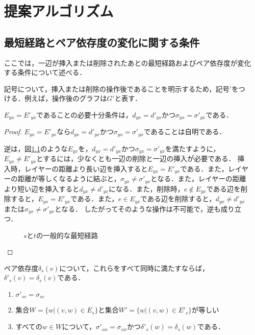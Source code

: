 \chapter{提案アルゴリズム}
\label{chap:algorithm}

\section{最短経路とペア依存度の変化に関する条件}
\label{sect:condition-of-variability}

ここでは，一辺が挿入または削除されたあとの最短経路およびペア依存度が変化する条件について述べる．

記号について，挿入または削除の操作後であることを明示するため，記号$'$をつける．例えば，操作後のグラフは$G'$と表す．

\begin{lemma}
  \label{lemma:condition-of-invariability-of-shortest-path}
  $E_{yx}=E'_{yx}$であることの必要十分条件は，$d_{yx}=d'_{yx}$かつ$\sigma_{yx}=\sigma'_{yx}$である．
\end{lemma}
\begin{proof}
  $E_{yx}=E'_{yx}$なら$d_{yx}=d'_{yx}$かつ$\sigma_{yx}=\sigma'_{yx}$であることは自明である．

  逆は，図\ref{fig:proof-invariability-of-paths}のような$E_{yx}$を，$d_{yx}=d'_{yx}$かつ$\sigma_{yx}=\sigma'_{yx}$を満たすように，$E_{yx}\neq E'_{yx}$とするには，少なくとも一辺の削除と一辺の挿入が必要である．
  挿入時，レイヤーの距離より長い辺を挿入すると$E_{yx}=E'_{yx}$である．また，レイヤーの距離が等しくなるように結ぶと，$\sigma_{yx}\neq\sigma'_{yx}$となる．また，レイヤーの距離より短い辺を挿入すると$d_{yx}\neq d'_{yx}$になる．また，削除時，$e\notin E_{yx}$である辺を削除すると，$E_{yx}=E'_{yx}$である．また，$e\in E_{yx}$である辺を削除すると，$d_{yx}\neq d'_{yx}$または$\sigma_{yx}\neq\sigma'_{yx}$となる．
  したがってそのような操作は不可能で，逆も成り立つ．

  \begin{figure}
    \centering
    \def\svgwidth{.5\columnwidth}
    
    \caption{$s$と$t$の一般的な最短経路}
    \label{fig:proof-invariability-of-paths}
  \end{figure}
\end{proof}

\begin{lemma-without-proof}
  \label{lemma:condition-of-invariability-of-pairwise-dependency}
  ペア依存度$\delta_s(v)$について，これらをすべて同時に満たすならば，$\delta'_s(v)=\delta_s(v)$である．
  \begin{enumerate}
  \item $\sigma'_{sv}=\sigma_{sv}$
  \item 集合$W=\{w|(v,w)\in E_s\}$と集合$W'=\{w|(v,w)\in E'_s\}$が等しい
  \item すべての$w\in W$について，$\sigma'_{sw}=\sigma_{sw}$かつ$\delta'_s(w)=\delta_s(w)$である．
  \end{enumerate}
\end{lemma-without-proof}

